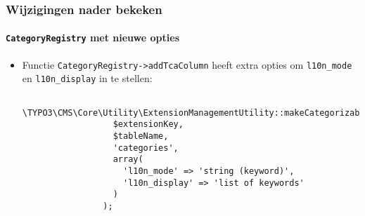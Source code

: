 \begin{frame}[fragile]
	\frametitle{Wijzigingen nader bekeken}
	\framesubtitle{\texttt{CategoryRegistry} met nieuwe opties}

	\lstset{basicstyle=\tiny\ttfamily}

	\begin{itemize}

		\item Functie \texttt{CategoryRegistry->addTcaColumn} heeft extra opties om
			\texttt{l10n\_mode} en \texttt{l10n\_display} in te stellen:

			\begin{lstlisting}
				\TYPO3\CMS\Core\Utility\ExtensionManagementUtility::makeCategorizable(
				  $extensionKey,
				  $tableName,
				  'categories',
				  array(
				    'l10n_mode' => 'string (keyword)',
				    'l10n_display' => 'list of keywords'
				  )
				);
			\end{lstlisting}

	\end{itemize}

\end{frame}


